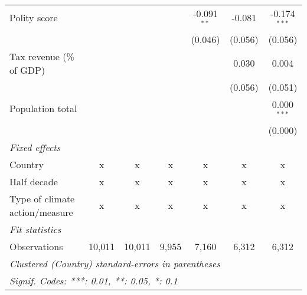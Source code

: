\begin{tabular}{lcccccc}
   Polity score                                                             &             &             &         & -0.091$^{**}$ & -0.081      & -0.174$^{***}$\\   
                                                                            &             &             &         & (0.046)       & (0.056)     & (0.056)\\   
   Tax revenue (\% of GDP)                                                  &             &             &         &               & 0.030       & 0.004\\   
                                                                            &             &             &         &               & (0.056)     & (0.051)\\   
   Population total                                                         &             &             &         &               &             & 0.000$^{***}$\\   
                                                                            &             &             &         &               &             & (0.000)\\   
   \emph{Fixed effects}\\
   Country                                                                  & x           & x           & x       & x             & x           & x\\  
   Half decade                                                              & x           & x           & x       & x             & x           & x\\  
   Type of climate action/measure                                           & x           & x           & x       & x             & x           & x\\  
   \midrule \emph{Fit statistics}\\
   Observations                                                             & 10,011      & 10,011      & 9,955   & 7,160         & 6,312       & 6,312\\  
   \midrule
   \multicolumn{7}{l}{\emph{Clustered (Country) standard-errors in parentheses}}\\
   \multicolumn{7}{l}{\emph{Signif. Codes: ***: 0.01, **: 0.05, *: 0.1}}\\
\end{tabular}
\par\endgroup


